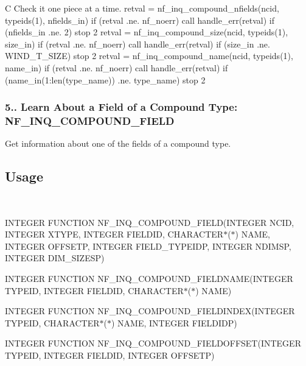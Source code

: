 C Check it one piece at a time. retval = nf\+\_\+inq\+\_\+compound\+\_\+nfields(ncid, typeids(1), nfields\+\_\+in) if (retval .ne. nf\+\_\+noerr) call handle\+\_\+err(retval) if (nfields\+\_\+in .ne. 2) stop 2 retval = nf\+\_\+inq\+\_\+compound\+\_\+size(ncid, typeids(1), size\+\_\+in) if (retval .ne. nf\+\_\+noerr) call handle\+\_\+err(retval) if (size\+\_\+in .ne. W\+I\+N\+D\+\_\+\+T\+\_\+\+S\+I\+ZE) stop 2 retval = nf\+\_\+inq\+\_\+compound\+\_\+name(ncid, typeids(1), name\+\_\+in) if (retval .ne. nf\+\_\+noerr) call handle\+\_\+err(retval) if (name\+\_\+in(1\+:len(type\+\_\+name)) .ne. type\+\_\+name) stop 2\hypertarget{nc_f77_interface_guide_f77_NF-INQ-COMPOUND-FIELD}{}\subsubsection{5.. Learn About a Field of a Compound Type\+: N\+F\+\_\+\+I\+N\+Q\+\_\+\+C\+O\+M\+P\+O\+U\+N\+D\+\_\+\+F\+I\+E\+LD}\label{nc_f77_interface_guide_f77_NF-INQ-COMPOUND-FIELD}
Get information about one of the fields of a compound type.

\subsection*{Usage }

 

I\+N\+T\+E\+G\+ER F\+U\+N\+C\+T\+I\+ON N\+F\+\_\+\+I\+N\+Q\+\_\+\+C\+O\+M\+P\+O\+U\+N\+D\+\_\+\+F\+I\+E\+LD(I\+N\+T\+E\+G\+ER N\+C\+ID, I\+N\+T\+E\+G\+ER X\+T\+Y\+PE, I\+N\+T\+E\+G\+ER F\+I\+E\+L\+D\+ID, C\+H\+A\+R\+A\+C\+T\+E\+R$\ast$($\ast$) N\+A\+ME, I\+N\+T\+E\+G\+ER O\+F\+F\+S\+E\+TP, I\+N\+T\+E\+G\+ER F\+I\+E\+L\+D\+\_\+\+T\+Y\+P\+E\+I\+DP, I\+N\+T\+E\+G\+ER N\+D\+I\+M\+SP, I\+N\+T\+E\+G\+ER D\+I\+M\+\_\+\+S\+I\+Z\+E\+SP)

I\+N\+T\+E\+G\+ER F\+U\+N\+C\+T\+I\+ON N\+F\+\_\+\+I\+N\+Q\+\_\+\+C\+O\+M\+P\+O\+U\+N\+D\+\_\+\+F\+I\+E\+L\+D\+N\+A\+ME(I\+N\+T\+E\+G\+ER T\+Y\+P\+E\+ID, I\+N\+T\+E\+G\+ER F\+I\+E\+L\+D\+ID, C\+H\+A\+R\+A\+C\+T\+E\+R$\ast$($\ast$) N\+A\+ME)

I\+N\+T\+E\+G\+ER F\+U\+N\+C\+T\+I\+ON N\+F\+\_\+\+I\+N\+Q\+\_\+\+C\+O\+M\+P\+O\+U\+N\+D\+\_\+\+F\+I\+E\+L\+D\+I\+N\+D\+EX(I\+N\+T\+E\+G\+ER T\+Y\+P\+E\+ID, C\+H\+A\+R\+A\+C\+T\+E\+R$\ast$($\ast$) N\+A\+ME, I\+N\+T\+E\+G\+ER F\+I\+E\+L\+D\+I\+DP)

I\+N\+T\+E\+G\+ER F\+U\+N\+C\+T\+I\+ON N\+F\+\_\+\+I\+N\+Q\+\_\+\+C\+O\+M\+P\+O\+U\+N\+D\+\_\+\+F\+I\+E\+L\+D\+O\+F\+F\+S\+ET(I\+N\+T\+E\+G\+ER T\+Y\+P\+E\+ID, I\+N\+T\+E\+G\+ER F\+I\+E\+L\+D\+ID, I\+N\+T\+E\+G\+ER O\+F\+F\+S\+E\+TP)

